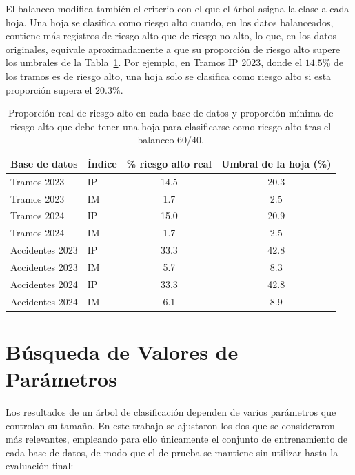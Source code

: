 \documentclass[twoside,a4paper,12pt,onecolumn,openany]{book}
\begin{document}
\vspace{0.5cm}
 
El balanceo modifica también el criterio con el que el árbol asigna la clase a cada hoja. Una hoja se clasifica como riesgo alto cuando, en los datos balanceados, contiene más registros de riesgo alto que de riesgo no alto, lo que, en los datos originales, equivale aproximadamente a que su proporción de riesgo alto supere los umbrales de la Tabla~\ref{tab:umbral_balanceo}. Por ejemplo, en Tramos IP 2023, donde el $14.5\%$ de los tramos es de riesgo alto, una hoja solo se clasifica como riesgo alto si esta proporción supera el $20.3\%$.

\begin{table}[H]
\centering
\small
\begin{tabular}{llcc}
\toprule
\textbf{Base de datos} & \textbf{Índice} & \textbf{\% riesgo alto real} & \textbf{Umbral de la hoja (\%)} \\
\midrule
Tramos 2023     & IP & 14.5 & 20.3 \\
Tramos 2023     & IM & 1.7  & 2.5  \\
Tramos 2024     & IP & 15.0 & 20.9 \\
Tramos 2024     & IM & 1.7  & 2.5  \\
\midrule
Accidentes 2023 & IP & 33.3 & 42.8 \\
Accidentes 2023 & IM & 5.7  & 8.3  \\
Accidentes 2024 & IP & 33.3 & 42.8 \\
Accidentes 2024 & IM & 6.1  & 8.9  \\
\bottomrule
\end{tabular}
\caption{Proporción real de riesgo alto en cada base de datos y proporción mínima de riesgo alto que debe tener una hoja para clasificarse como riesgo alto tras el balanceo 60/40.}
\label{tab:umbral_balanceo}
\end{table}
 
\section{Búsqueda de Valores de Parámetros}
\label{sec:busqueda}
 
Los resultados de un árbol de clasificación dependen de varios parámetros que controlan su tamaño. En este trabajo se ajustaron los dos que se consideraron más relevantes, empleando para ello únicamente el conjunto de entrenamiento de cada base de datos, de modo que el de prueba se mantiene sin utilizar hasta la evaluación final:
 
\end{document}
